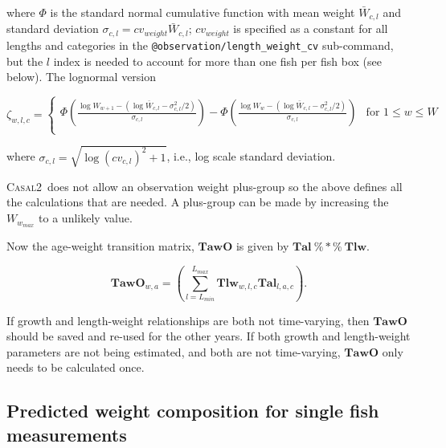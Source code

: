 \documentclass[a4paper,11pt,twoside,pdftex,draft]{article}
\newcommand{\CNAME}{\textsc{Casal2}}
\begin{document}
where $\Phi$ is the standard normal cumulative function with mean weight $\bar W_{c,l}$ and standard deviation $\sigma_{c,l}= cv_{weight} \bar W_{c,l}$; $cv_{weight}$ is specified as a constant for all lengths and categories  in the  \texttt{@observation/length\_weight\_cv} sub-command, but the $l$ index is needed to account for more than one fish per fish box (see below). The lognormal version

\begin{equation}
\zeta_{w,l,c} =
\begin{cases}

\Phi\left( \frac{\log W_{w+1} - \left( \log\bar W_{c,l}  - \sigma_{c,l}^2/2 \right)}{\sigma_{c,l}} \right)   - \Phi\left( \frac{\log W_{w} - \left( \log\bar W_{c,l}  - \sigma_{c,l}^2/2 \right)}{\sigma_{c,l}} \right) & \text{for } 1 \leq w \leq W \\

\end{cases}
\end{equation}

where $\sigma_{c,l} = \sqrt{\log(cv_{c,l})^2 + 1}$, i.e., log scale standard deviation.

\CNAME~does not allow an observation weight plus-group so the above defines all the calculations that are needed. A plus-group can be made by increasing the $W_{w_{max}}$ to a unlikely value.

Now the age-weight transition matrix, $\mathbf{TawO}$ is given by $\mathbf{Tal} \ \%*\%\ \mathbf{Tlw} $.

\begin{equation}
\mathbf{TawO}_{w,a} = \left( \sum_{l=L_{min}}^{L_{max}}  \mathbf{Tlw}_{w,l,c}  \mathbf{Tal}_{l,a,c}\right).
\end{equation}

If growth and length-weight relationships are both not time-varying, then $\mathbf{TawO}$ should be saved and re-used for the other years. If both growth and length-weight parameters are not being estimated, and both are not time-varying, $\mathbf{TawO}$ only needs to be calculated once.


\subsection{Predicted weight composition for single fish measurements}
\end{document}
